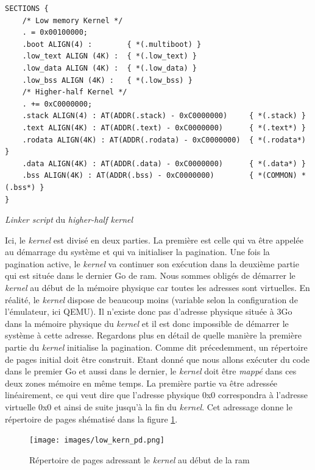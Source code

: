 \begin{code}
\begin{verbatim}
SECTIONS {
    /* Low memory Kernel */
    . = 0x00100000;
    .boot ALIGN(4) :        { *(.multiboot) }
    .low_text ALIGN (4K) :  { *(.low_text) }
    .low_data ALIGN (4K) :  { *(.low_data) }
    .low_bss ALIGN (4K) :   { *(.low_bss) }
    /* Higher-half Kernel */
    . += 0xC0000000;
    .stack ALIGN(4) : AT(ADDR(.stack) - 0xC0000000)     { *(.stack) }
    .text ALIGN(4K) : AT(ADDR(.text) - 0xC0000000)      { *(.text*) }
    .rodata ALIGN(4K) : AT(ADDR(.rodata) - 0xC0000000)  { *(.rodata*) }
    .data ALIGN(4K) : AT(ADDR(.data) - 0xC0000000)      { *(.data*) }
    .bss ALIGN(4K) : AT(ADDR(.bss) - 0xC0000000)        { *(COMMON) *(.bss*) }
}
\end{verbatim}
\caption{\textit{Linker script} du \textit{higher-half kernel}}
\label{lst:mem:paging:linker}
\end{code} \bigbreak

Ici, le \textit{kernel} est divisé en deux parties. La première est celle qui va
être appelée au démarrage du système et qui va initialiser la pagination. Une fois
la pagination active, le \textit{kernel} va continuer son exécution dans la deuxième
partie qui est située dans le dernier Go de \acrshort{ram}. Nous sommes obligés de
démarrer le \textit{kernel} au début de la mémoire physique car toutes les adresses
sont virtuelles. En réalité, le \textit{kernel} dispose de beaucoup moins (variable
selon la configuration de l'émulateur, ici QEMU). Il n'existe donc pas d'adresse
physique située à 3Go dans la mémoire physique du \textit{kernel} et il est donc
impossible de démarrer le système à cette adresse. Regardons plus en détail de quelle
manière la première partie du \textit{kernel} initialise la pagination. Comme dit
précedemment, un répertoire de pages initial doit être construit. Etant donné que
nous allons exécuter du code dans le premier Go et aussi dans le dernier, le \textit{kernel}
doit être \textit{mappé} dans ces deux zones mémoire en même temps. La première
partie va être adressée linéairement, ce qui veut dire que l'adresse physique
0x0 correspondra à l'adresse virtuelle 0x0 et ainsi de suite jusqu'à la fin du
\textit{kernel}. Cet adressage donne le répertoire de pages shématisé dans la figure
\ref{low_kern_pd}.

\begin{figure}[!h]
  \centering
  \texttt{[image: images/low\_kern\_pd.png]}
  \caption{Répertoire de pages adressant le \textit{kernel} au début de la \acrshort{ram}}
  \label{low_kern_pd}
\end{figure}

